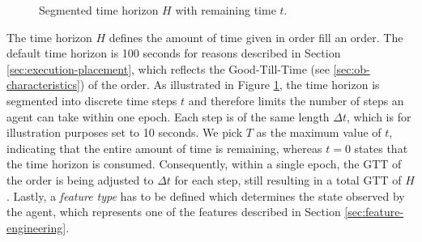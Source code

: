 \begin{figure}[H]
    \centering
    \caption{Segmented time horizon $H$ with remaining time $t$.}
    \label{fig:setup-time-horizon}
\end{figure}

The time horizon $H$ defines the amount of time given in order fill an order.
The default time horizon is 100 seconds for reasons described in Section \ref{sec:execution-placement}, which reflects the Good-Till-Time (see \ref{sec:ob-characteristics}) of the order.
As illustrated in Figure \ref{fig:setup-time-horizon}, the time horizon is segmented into discrete time steps $t$ and therefore limits the number of steps an agent can take within one epoch.
Each step is of the same length $\Delta{t}$, which is for illustration purposes set to 10 seconds.
We pick $T$ as the maximum value of $t$, indicating that the entire amount of time is remaining, whereas $t=0$ states that the time horizon is consumed.
Consequently, within a single epoch, the GTT of the order is being adjusted to $\Delta{t}$ for each step, still resulting in a total GTT of $H$.
Lastly, a \textit{feature type} has to be defined which determines the state observed by the agent, which represents one of the features described in Section \ref{sec:feature-engineering}.

